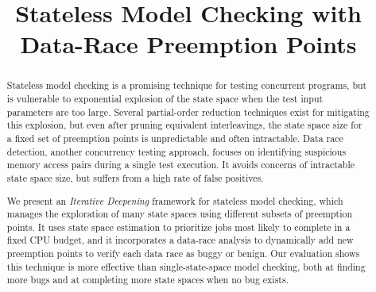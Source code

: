 \documentclass[pldi]{sigplanconf-pldi15}
\begin{document}
%
%

\newcommand\landslide{\textsc{Landslide}}
\newcommand\quicksand{\textsc{Quicksand}}
\newcommand\simics{\textsc{Simics}}
\newcommand{\sect}[1]{\S #1}
\newcommand\hilight[2]{\color{#1}#2\color{black}}

\newcommand\numthrlibs{79}
\newcommand\numpintoses{79}
\newcommand\numstudence{158} %

\title{Stateless Model Checking with Data-Race Preemption Points}

\maketitle
\begin{abstract}
Stateless model checking is a promising technique for testing concurrent programs,
but is vulnerable to exponential explosion of the state space when the test input parameters are too large.
Several partial-order reduction techniques exist for mitigating this explosion,
but even after pruning equivalent interleavings, the state space size for a fixed set of preemption points is unpredictable and often intractable.
%
Data race detection, another concurrency testing approach, focuses on identifying suspicious memory access pairs during a single test execution.
It avoids concerns of intractable state space size, but suffers from a high rate of false positives.

We present an {\em Iterative Deepening} framework for stateless model checking,
which manages the exploration of many state spaces using different subsets of preemption points.
It uses state space estimation to prioritize jobs most likely to complete in a fixed CPU budget,
and it incorporates a data-race analysis to dynamically add new preemption points to verify each data race as buggy or benign.
%
Our evaluation shows this technique is
more effective than single-state-space model checking, both at finding more bugs and at completing more state spaces when no bug exists.

\end{abstract}
\end{document}
